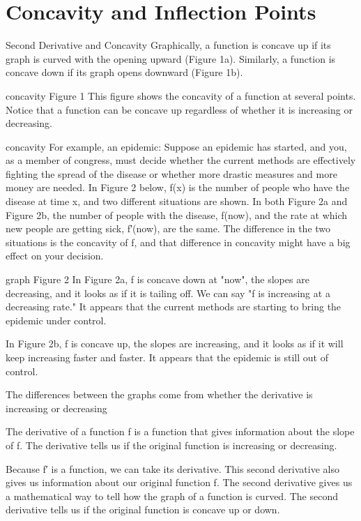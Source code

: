 \section{Concavity and Inflection Points}
\label{sec:concavity}

Second Derivative and Concavity
Graphically, a function is concave up if its graph is curved with the opening upward (Figure 1a). Similarly, a function is concave down if its graph opens downward (Figure 1b).

concavity
Figure 1
This figure shows the concavity of a function at several points. Notice that a function can be concave up regardless of whether it is increasing or decreasing.

concavity
For example, an epidemic: Suppose an epidemic has started, and you, as a member of congress, must decide whether the current methods are effectively fighting the spread of the disease or whether more drastic measures and more money are needed. In Figure 2 below, f(x) is the number of people who have the disease at time x, and two different situations are shown. In both Figure 2a and Figure 2b, the number of people with the disease, f(now), and the rate at which new people are getting sick, f′(now), are the same. The difference in the two situations is the concavity of f, and that difference in concavity might have a big effect on your decision.

graph
Figure 2
In Figure 2a, f is concave down at "now", the slopes are decreasing, and it looks as if it is tailing off. We can say "f is increasing at a decreasing rate." It appears that the current methods are starting to bring the epidemic under control.

In Figure 2b, f is concave up, the slopes are increasing, and it looks as if it will keep increasing faster and faster. It appears that the epidemic is still out of control.

The differences between the graphs come from whether the derivative is increasing or decreasing

The derivative of a function f is a function that gives information about the slope of f. The derivative tells us if the original function is increasing or decreasing.

Because f′ is a function, we can take its derivative. This second derivative also gives us information about our original function f. The second derivative gives us a mathematical way to tell how the graph of a function is curved. The second derivative tells us if the original function is concave up or down.


